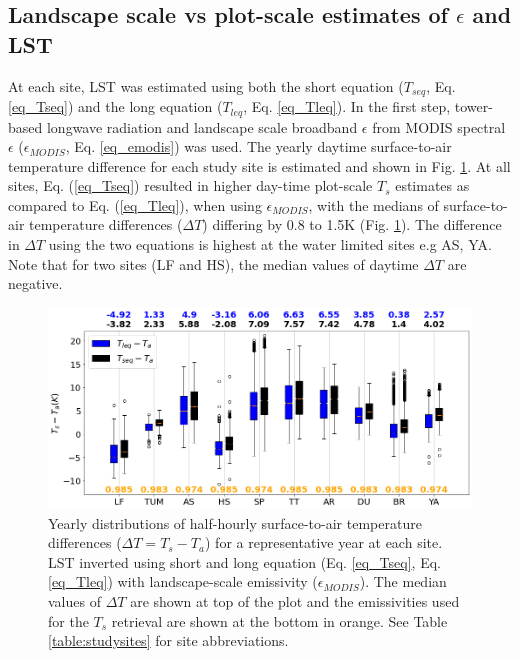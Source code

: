 \documentclass[fleqn,10pt]{wlscirep}
\begin{document}
\subsection{Landscape scale vs plot-scale estimates of $\epsilon$ and LST}
At each site, LST was estimated using both the short equation ($T_{seq}$, Eq. \ref{eq_Tseq}) and the long equation ($T_{leq}$, Eq. \ref{eq_Tleq}). In the first step, tower-based longwave radiation and landscape scale broadband $\epsilon$ from MODIS spectral $\epsilon$ ($\epsilon_{MODIS}$, Eq. \ref{eq_emodis}) was used. The yearly daytime surface-to-air temperature difference for each study site is estimated and shown in Fig. \ref{fig:long_short_eq_epsilon_MODIS}. At all sites, Eq. (\ref{eq_Tseq}) resulted in higher day-time plot-scale $T_{s}$ estimates as compared to Eq. (\ref{eq_Tleq}), when using $\epsilon_{MODIS}$, with the medians of surface-to-air temperature differences ($\Delta T$) differing by 0.8 to 1.5K (Fig. \ref{fig:long_short_eq_epsilon_MODIS}). The difference in $\Delta T$ using the two equations is highest at the water limited sites e.g AS, YA. Note that for two sites (LF and HS), the median values of daytime $\Delta T$ are negative.
\begin{figure}[h!]
	\includegraphics[scale=0.35]{Ts_Talocalleqseq.png}
	\centering
    \caption{
     Yearly distributions of half-hourly surface-to-air temperature differences ($\Delta T = T_s - T_a$) for a representative year at each site.  %
    LST inverted using short and long equation (Eq. \ref{eq_Tseq}, Eq. \ref{eq_Tleq}) with landscape-scale emissivity ($\epsilon_{MODIS}$).
    The median values of $\Delta T$ are shown at top of the plot and the emissivities used for the $T_{s}$ retrieval are shown at the bottom in orange. See Table \ref{table:studysites} for site abbreviations.}
	\label{fig:long_short_eq_epsilon_MODIS}
\end{figure}
\end{document}

